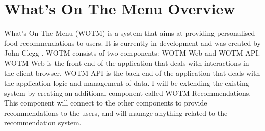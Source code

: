 
\section{What's On The Menu Overview}

What's On The Menu (WOTM) is a system that aims at providing personalised food recommendations to users. It is currently in development and was created by John Clegg . WOTM consists of two components: WOTM Web and WOTM API. WOTM Web is the front-end of the application that deals with interactions in the client browser. WOTM API is the back-end of the application that deals with the application logic and management of data. I will be extending the existing system by creating an additional component called WOTM Recommendations. This component will connect to the other components to provide recommendations to the users, and will manage anything related to the recommendation system. 

